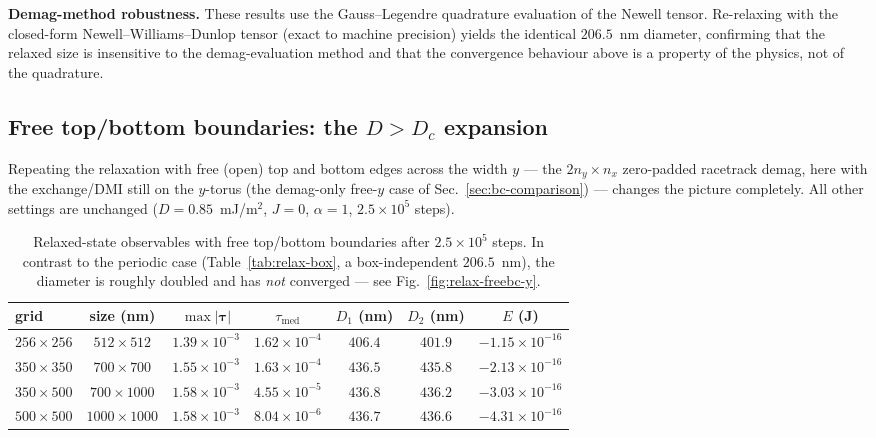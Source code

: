 \documentclass[11pt,a4paper]{article}
\newcommand{\mb}[1]{\mathbf{#1}}
\begin{document}
\textbf{Demag-method robustness.} These results use the Gauss--Legendre
quadrature evaluation of the Newell tensor. Re-relaxing with the
closed-form Newell--Williams--Dunlop tensor (exact to machine
precision) yields the identical $206.5$~nm diameter, confirming that
the relaxed size is insensitive to the demag-evaluation method and that
the convergence behaviour above is a property of the physics, not of
the quadrature.

\subsection{Free top/bottom boundaries: the $D>D_c$ expansion}
\label{sec:relax-freebc-y}

Repeating the relaxation with free (open) top and bottom edges across
the width $y$ --- the $2n_y\times n_x$ zero-padded racetrack demag, here
with the exchange/DMI still on the $y$-torus (the demag-only free-$y$
case of Sec.~\ref{sec:bc-comparison}) --- changes the picture completely.
All other settings are unchanged ($D=0.85$~mJ/m$^2$, $J=0$,
$\alpha=1$, $2.5\times10^{5}$ steps).

\begin{table}[H]
\centering
\small
\setlength{\tabcolsep}{3pt}
\begin{tabular}{l c c c c c c}
\hline
grid & size (nm) & $\max|\mb{\tau}|$ & $\tau_{\mathrm{med}}$ &
$D_1$ (nm) & $D_2$ (nm) & $E$ (J)\\
\hline
$256\times256$ & $512\times512$   & $1.39\times10^{-3}$ & $1.62\times10^{-4}$
  & $406.4$ & $401.9$ & $-1.15\times10^{-16}$\\
$350\times350$ & $700\times700$   & $1.55\times10^{-3}$ & $1.63\times10^{-4}$
  & $436.5$ & $435.8$ & $-2.13\times10^{-16}$\\
$350\times500$ & $700\times1000$  & $1.58\times10^{-3}$ & $4.55\times10^{-5}$
  & $436.8$ & $436.2$ & $-3.03\times10^{-16}$\\
$500\times500$ & $1000\times1000$ & $1.58\times10^{-3}$ & $8.04\times10^{-6}$
  & $436.7$ & $436.6$ & $-4.31\times10^{-16}$\\
\hline
\end{tabular}
\caption{Relaxed-state observables with free top/bottom boundaries
after $2.5\times10^{5}$ steps. In contrast to the periodic case
(Table~\ref{tab:relax-box}, a box-independent $206.5$~nm), the diameter
is roughly doubled and has \emph{not} converged --- see
Fig.~\ref{fig:relax-freebc-y}.}
\label{tab:relax-box-freebcy}
\end{table}
\end{document}
